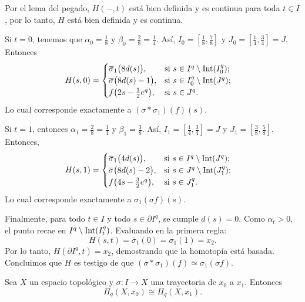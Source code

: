 \begin{dem}
    Por el lema del pegado, $H(-,t)$ está bien definida y es continua para toda $t\in I$, por lo tanto, $H$ está bien definida y es continua.
    
    Si $t=0$, tenemos que $\alpha_0 = \frac{1}{8}$ y $\beta_0 = \frac{2}{8} = \frac{1}{4}$. Así, $I_0 = [\frac{1}{8}, \frac{7}{8}]$ y $J_0 = [\frac{1}{4}, \frac{3}{4}] = J$. Entonces
    \begin{align*}
        H(s, 0) &= 
        \begin{cases}
            \overline{\sigma}_1\big( 8d(s) \big), & \text{si } s \in I^q \setminus \mathrm{Int}(I_0^q); \\
            \overline{\sigma}\big( 8d(s) - 1 \big), & \text{si } s \in I_0^q \setminus \mathrm{Int}(J^q); \\
            f\big( 2s - \frac{1}{2}e^q \big), & \text{si } s \in J^q.
        \end{cases}
    \end{align*}
    Lo cual corresponde exactamente a $(\sigma * \sigma_1)(f)(s)$.

    Si $t=1$, entonces $\alpha_1 = \frac{2}{8} = \frac{1}{4}$ y $\beta_1 = \frac{3}{8}$. Así, $I_1 = [\frac{1}{4}, \frac{3}{4}] = J$ y $J_1 = [\frac{3}{8}, \frac{5}{8}]$. Entonces, 
    \begin{align*}
        H(s, 1) &= 
        \begin{cases}
            \overline{\sigma}_1\big( 4d(s) \big), & \text{si } s \in I^q \setminus \mathrm{Int}(J^q); \\
            \overline{\sigma}\big( 8d(s) - 2 \big), & \text{si } s \in J^q \setminus \mathrm{Int}(J_1^q); \\
            f\big( 4s - \frac{3}{2}e^q \big), & \text{si } s \in J_1^q.
        \end{cases}
    \end{align*}
    Lo cual corresponde exactamente a $\sigma_1(\sigma f)(s)$.

    Finalmente, para todo $t \in I$ y todo $s \in \partial I^q$, se cumple $d(s) = 0$. Como $\alpha_t > 0$, el punto recae en $I^q \setminus \mathrm{Int}(I_t^q)$. Evaluando en la primera regla:
    \[
        H(s, t) = \overline{\sigma}_1(0) = \sigma_1(1) = x_2.
    \]
    Por lo tanto, $H(\partial I^q, t) = x_2$, demostrando que la homotopía está basada. Concluimos que $H$ es testigo de que $(\sigma * \sigma_1)(f) \simeq \sigma_1(\sigma f)$.
\end{dem}
\begin{coro}
    Sea $X$ un espacio topológico y $\sigma:I\to X$ una trayectoria de $x_0$ a $x_1$. Entonces $$\Pi_q(X,x_0)\cong\Pi_q(X,x_1).$$
\end{coro}

